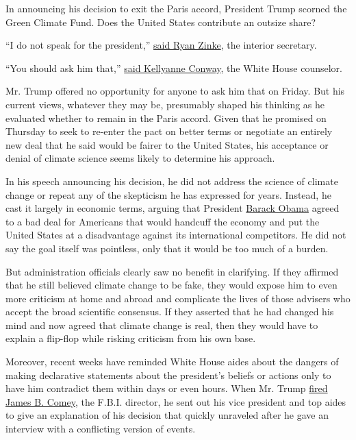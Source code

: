 In announcing his decision to exit the Paris accord, President Trump
scorned the Green Climate Fund. Does the United States contribute an
outsize share?

``I do not speak for the president,''
\href{http://www.cnn.com/2017/06/02/politics/donald-trump-climate-change-belief/}{said
Ryan Zinke}, the interior secretary.

``You should ask him that,''
\href{http://abcnews.go.com/US/trump-counselor-kellyanne-conway-wont-president-believes-global/story?id=47787361}{said
Kellyanne Conway}, the White House counselor.

Mr. Trump offered no opportunity for anyone to ask him that on Friday.
But his current views, whatever they may be, presumably shaped his
thinking as he evaluated whether to remain in the Paris accord. Given
that he promised on Thursday to seek to re-enter the pact on better
terms or negotiate an entirely new deal that he said would be fairer to
the United States, his acceptance or denial of climate science seems
likely to determine his approach.

In his speech announcing his decision, he did not address the science of
climate change or repeat any of the skepticism he has expressed for
years. Instead, he cast it largely in economic terms, arguing that
President
\href{https://www.nytimes3xbfgragh.onion/topic/person/barack-obama}{Barack
Obama} agreed to a bad deal for Americans that would handcuff the
economy and put the United States at a disadvantage against its
international competitors. He did not say the goal itself was pointless,
only that it would be too much of a burden.

But administration officials clearly saw no benefit in clarifying. If
they affirmed that he still believed climate change to be fake, they
would expose him to even more criticism at home and abroad and
complicate the lives of those advisers who accept the broad scientific
consensus. If they asserted that he had changed his mind and now agreed
that climate change is real, then they would have to explain a flip-flop
while risking criticism from his own base.

Moreover, recent weeks have reminded White House aides about the dangers
of making declarative statements about the president's beliefs or
actions only to have him contradict them within days or even hours. When
Mr. Trump
\href{https://www.nytimes3xbfgragh.onion/2017/05/09/us/politics/james-comey-fired-fbi.html}{fired
James B. Comey}, the F.B.I. director, he sent out his vice president and
top aides to give an explanation of his decision that quickly unraveled
after he gave an interview with a conflicting version of events.

